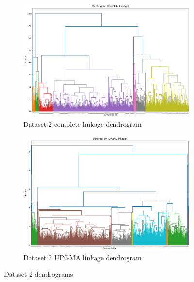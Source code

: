 \documentclass[12pt]{report}
\begin{document}
	\begin{figure}[H]
		\centering
		\begin{subfigure}{.5\textwidth}
			\centering
			\includegraphics[width=.9\linewidth]{../AHC/Dendrograms/Dataset2/completeLinkage.png}
			\caption{Dataset 2 complete linkage dendrogram}
			\label{Dataset2completeLinkage}
		\end{subfigure}%
		\begin{subfigure}{.5\textwidth}
			\centering
			\includegraphics[width=.9\linewidth]{../AHC/Dendrograms/Dataset2/UPGMA_linkage.png}
			\caption{Dataset 2 UPGMA linkage dendrogram}
			\label{Dataset2UPGMA}
		\end{subfigure}
		\caption{Dataset 2 dendrograms}
		\label{Dataset2Dendrograms}
	\end{figure}

	\newpage
\end{document}
